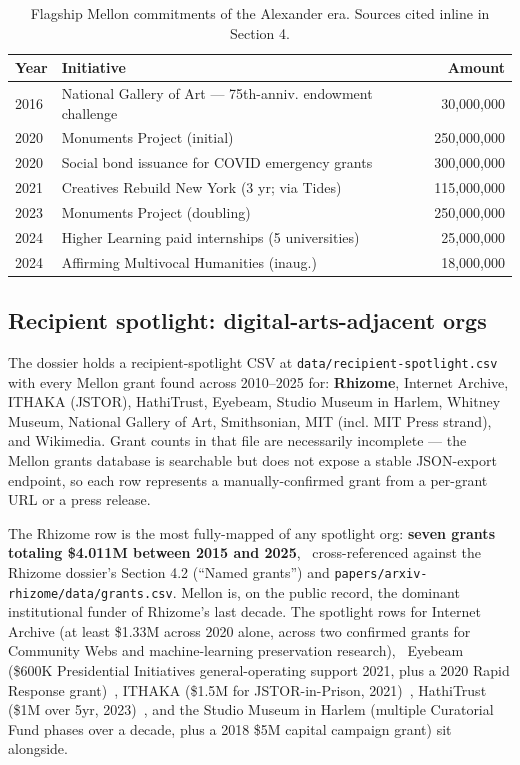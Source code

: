 \documentclass[10pt,letterpaper,twocolumn]{article}
\begin{document}
\begin{table}[h]
\footnotesize
\centering
\begin{tabularx}{\columnwidth}{l>{\raggedright\arraybackslash\hspace{0pt}}Xr}
\toprule
\textbf{Year} & \textbf{Initiative} & \textbf{Amount} \\
\midrule
2016 & National Gallery of Art --- 75th-anniv. endowment challenge & 30{,}000{,}000 \\
2020 & Monuments Project (initial) & 250{,}000{,}000 \\
2020 & Social bond issuance for COVID emergency grants & 300{,}000{,}000 \\
2021 & Creatives Rebuild New York (3 yr; via Tides) & 115{,}000{,}000 \\
2023 & Monuments Project (doubling) & 250{,}000{,}000 \\
2024 & Higher Learning paid internships (5 universities) & 25{,}000{,}000 \\
2024 & Affirming Multivocal Humanities (inaug.) & 18{,}000{,}000 \\
\bottomrule
\end{tabularx}
\caption{Flagship Mellon commitments of the Alexander era. Sources cited inline in Section 4.}
\label{tab:flagships}
\end{table}

\subsection{Recipient spotlight: digital-arts-adjacent orgs}

The dossier holds a recipient-spotlight CSV at \texttt{data/recipient-spotlight.csv} with every Mellon grant found across 2010--2025 for: \textbf{Rhizome}, Internet Archive, ITHAKA (JSTOR), HathiTrust, Eyebeam, Studio Museum in Harlem, Whitney Museum, National Gallery of Art, Smithsonian, MIT (incl. MIT Press strand), and Wikimedia. Grant counts in that file are necessarily incomplete --- the Mellon grants database is searchable but does not expose a stable JSON-export endpoint, so each row represents a manually-confirmed grant from a per-grant URL or a press release.

The Rhizome row is the most fully-mapped of any spotlight org: \textbf{seven grants totaling \$4.011M between 2015 and 2025},~\citep{rhizomedossier} cross-referenced against the Rhizome dossier's Section 4.2 (``Named grants'') and \texttt{papers/arxiv-rhizome/data/grants.csv}. Mellon is, on the public record, the dominant institutional funder of Rhizome's last decade. The spotlight rows for Internet Archive (at least \$1.33M across 2020 alone, across two confirmed grants for Community Webs and machine-learning preservation research),~\citep{mellonia2020a,mellonia2020b} Eyebeam (\$600K Presidential Initiatives general-operating support 2021, plus a 2020 Rapid Response grant)~\citep{mellonebeam2021}, ITHAKA (\$1.5M for JSTOR-in-Prison, 2021)~\citep{mellonjstor2021}, HathiTrust (\$1M over 5yr, 2023)~\citep{mellonhathitrust2023}, and the Studio Museum in Harlem (multiple Curatorial Fund phases over a decade, plus a 2018 \$5M capital campaign grant) sit alongside.
\end{document}
